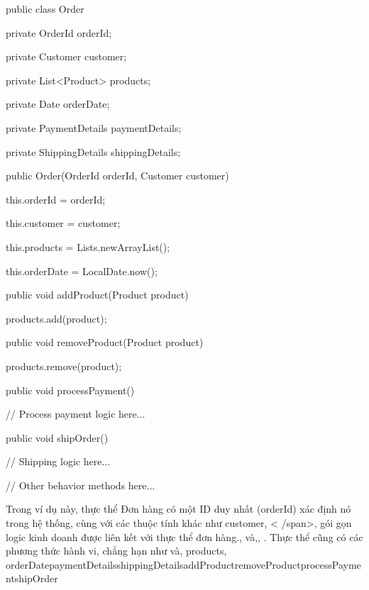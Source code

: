public class Order {

        private OrderId orderId;

        private Customer customer;

        private List<Product> products;

        private Date orderDate;

        private PaymentDetails paymentDetails;

        private ShippingDetails shippingDetails;

        public Order(OrderId orderId, Customer customer) {

                this.orderId = orderId;

                this.customer = customer;

                this.products = Lists.newArrayList();

                this.orderDate = LocalDate.now();

            }

        public void addProduct(Product product) {

                products.add(product);

            }

        public void removeProduct(Product product) {

                products.remove(product);

            }

        public void processPayment() {

                // Process payment logic here...

            }

        public void shipOrder() {

                // Shipping logic here...

            }

        // Other behavior methods here...

    }

Trong ví dụ này, thực thể Đơn hàng có một ID duy nhất (orderId) xác định nó trong hệ thống, cùng với các thuộc tính khác như customer, < /span>, gói gọn logic kinh doanh được liên kết với thực thể đơn hàng., và,, . Thực thể cũng có các phương thức hành vi, chẳng hạn như và, products, orderDatepaymentDetailsshippingDetailsaddProductremoveProductprocessPaymentshipOrder




